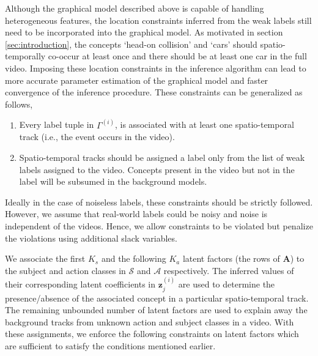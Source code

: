 \documentclass[runningheads]{llncs}
\begin{document}
Although the graphical model described above is capable of handling heterogeneous features, the location constraints inferred from the weak labels still need to be incorporated into the graphical model. As motivated in section \ref{sec:introduction}, 
the concepts `head-on collision' and `cars' should spatio-temporally co-occur at least once and there should be at least one car in the full video. Imposing these location constraints in the inference algorithm can lead to more accurate parameter estimation of the graphical model and faster convergence of the inference procedure. These constraints can be generalized as follows,
\vspace{-2mm}
\begin{enumerate}[leftmargin=*,labelindent=.1cm, labelsep=0.1cm,align=left,noitemsep]
\setlength\itemsep{0em}
\item Every label tuple in $\Gamma^{(i)}$, is associated with at least one spatio-temporal track (i.e., the event occurs in the video).
\item Spatio-temporal tracks should be assigned a label only from the list of weak labels assigned to the video. Concepts present in the video but not in the label will be subsumed in the background models.
\end{enumerate}
\vspace{-2mm}
Ideally in the case of noiseless labels, these constraints should be strictly followed. However, we assume that real-world labels could be noisy and noise is independent of the videos. Hence, we allow constraints to be violated but penalize the violations using additional slack variables.

We associate the first $K_s$ and the following $K_a$ latent factors (the rows of $\mathbf{A}$) to the subject and action classes in $\mathcal{S}$ and $\mathcal{A}$ respectively. The inferred values of their corresponding latent coefficients in $\mathbf{z}^{(i)}_{j}$ are used to determine the presence/absence of the associated concept in a particular spatio-temporal track. The remaining unbounded number of latent factors are used to explain away the background tracks from unknown action and subject classes in a video. With these assignments, we enforce the following constraints on latent factors which are sufficient to satisfy the conditions mentioned earlier.
\end{document}
